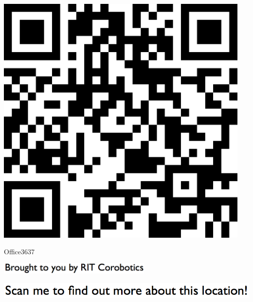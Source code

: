 \documentclass[letterpaper]{article}
\begin{document}
 \begingroup 
 \centerline{\includegraphics[scale=1,width=5in,height=5in]{Office3637.png}} 
 \endgroup 
 \vspace*{\fill} 

 \hfill{\small Office3637} 

  \vspace{0.7in} 
 
 \centerline{\includegraphics[scale=1,width=3in]{text-bottom.png}} 
 
 \pagebreak 
{} 
 \vspace*{\fill} 
 
  \centerline{\includegraphics[scale=1,width=6in]{text-top.png}} 
 
 \vspace{0.5in} 
 
\end{document}
